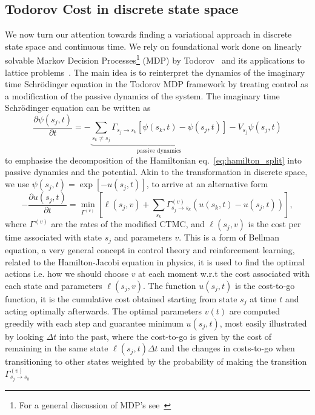 \subsection{Todorov Cost in discrete state space}
We now turn our attention towards finding a variational approach in discrete state space and continuous time. We rely on foundational work done on linearly solvable Markov Decision Processes\footnote{For a general discussion of MDP's see~\cite{sutton2018reinforcement}} (MDP) by Todorov~\cite{todorov2007linearly, todorov2009efficient} and its applications to lattice problems~\cite{gispen2020ground}. The main idea is to reinterpret the dynamics of the imaginary time Schr\" odinger equation in the Todorov MDP framework by treating control as a modification of the passive dynamics of the system. The imaginary time Schr\" odinger equation can be written as
\begin{equation}
	\label{eq:sch_split}
	\frac{\partial \psi(s_j, t)}{\partial t}=-\underbrace{\sum_{s_k \neq s_j} \Gamma_{s_j \rightarrow s_k}\left[\psi(s_k, t)-\psi(s_j, t)\right]}_{\text{passive dynamics}}
	-V_{s_j} \psi(s_j, t)
\end{equation}
to emphasise the decomposition of the Hamiltonian eq.~\eqref{eq:hamilton_split} into passive dynamics and the potential. Akin to the transformation in discrete space, we use $\psi(s_j, t)=\exp[-u(s_j, t)]$, to arrive at an alternative form
\begin{equation}
	\label{eq:bellman_sch}
	-\frac{\partial u(s_j, t)}{\partial t}=\min _{\Gamma^{(v)}}\left[\ell(s_j, v)+\sum_{s_k} \Gamma_{s_j \rightarrow s_k}^{(v)}(u(s_k, t)-u(s_j, t))\right],
\end{equation}
where $\Gamma^{(v)}$ are the rates of the modified CTMC, and $\ell(s_j, v)$ is the cost per time associated with state $s_j$ and parameters $v$.
This is a form of Bellman equation, a very general concept in control theory and reinforcement learning, related to the Hamilton-Jacobi equation in physics, it is used to find the optimal actions i.e. how we should choose $v$ at each moment w.r.t the cost associated with each state and parameters $\ell(s_j, v)$. The function $u(s_j, t)$ is the cost-to-go function, it is the cumulative cost obtained starting from state $s_j$ at time $t$ and acting optimally afterwards. The optimal parameters $v(t)$ are computed greedily with each step and guarantee minimum $u(s_j, t)$, most easily illustrated by looking $\Delta t$ into the past, where the cost-to-go is given by the cost of remaining in the same state $\ell(s_j, t) \Delta t$ and the changes in costs-to-go when transitioning to other states weighted by the probability of making the transition $\Gamma^{(v)}_{s_j \rightarrow s_k}$
